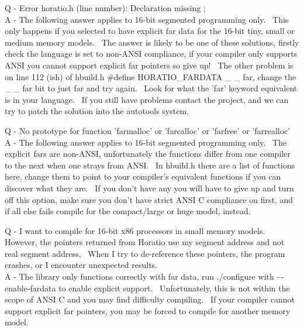 \documentclass{article}
\begin{document}
\par Q - Error horatio.h (line number): Declaration missing ;
\\
A - The following answer applies to 16-bit segmented programming
only.~ This only happens if you selected to have explicit far data
for the 16-bit tiny, small
or medium memory models.~ The answer is likely to be one of these solutions,
firstly check the language is set to non-ANSI compliance, if your
compiler
only supports ANSI you cannot support explicit far pointers so give
up!~
The other problem is on line 112 (ish) of hbuild.h \#define
HORATIO\_FARDATA
\_ \_ far, change the \_ \_ far bit to just far and try again.~ Look
for
what the 'far' keyword equivalent is in your language.~ If you
still
have problems contact the project, and we can try to patch the solution into the autotools system.

\par Q - No prototype for function 'farmalloc' or 'farcalloc' or
'farfree'
or 'farrealloc'
\\
A - The following answer applies to 16-bit segmented programming
only.~ The explicit fars are non-ANSI, unfortunately the functions
differ
from one compiler to the next when one strays from ANSI.~ In
hbuild.h
there are a list of functions here, change them to point to your
compiler's
equivalent functions if you can discover what they are.~ If you
don't
have any you will have to give up and turn off this option, make sure
you
don't have strict ANSI C compliance on first, and if all
else
fails compile for the compact/large or huge model, instead.

\par Q - I want to compile for 16-bit x86 processors in small memory
models.~ However, the pointers returned from Horatio use my
segment address and not real segment address,~ When I try to
de-reference these pointers, the program crashes, or I encounter unexpected results.\\

A - The library only functions correctly with far data, run ./configure
with -$\,$-enable-fardata to enable explicit support.~ Unfortunately,
this is not within the scope of ANSI C and you may find difficulty
compiling.~ If your compiler cannot support explicit far pointers,
you may be forced to compile for another memory model.\\
\end{document}
